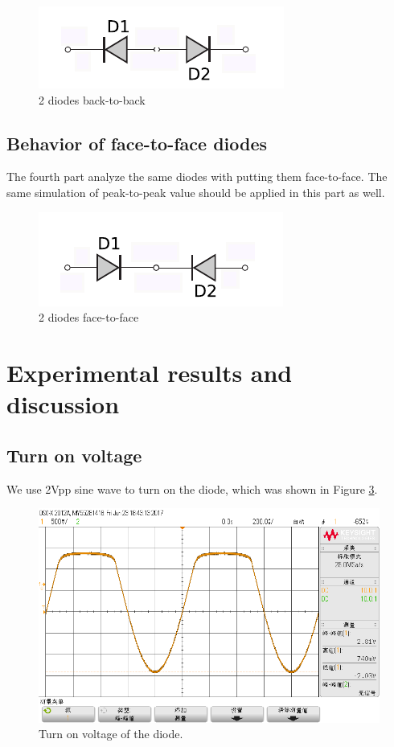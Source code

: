 \documentclass{article}
\begin{document}
\begin{figure}[htbp]
	\centering
	\includegraphics[width=0.5\linewidth]{imgs/intro-3.png}
	\caption{2 diodes back-to-back}
	\label{fig-intro-3}
\end{figure}

\subsection{Behavior of face-to-face diodes}
The fourth part analyze the same diodes with putting them face-to-face. The same simulation of peak-to-peak value should be applied in this part as well.

\begin{figure}[htbp]
	\centering
	\includegraphics[width=0.5\linewidth]{imgs/intro-4.png}
	\caption{2 diodes face-to-face}
	\label{fig-intro-4}
\end{figure}

\newpage
\section{Experimental results and discussion}

\subsection{Turn on voltage}

We use 2Vpp sine wave to turn on the diode, which was shown in Figure \ref{fig-1}.

\begin{figure}[htbp]
	\centering
	\includegraphics[width=0.7\linewidth]{imgs/scope_30.png}
	\caption{Turn on voltage of the diode.}
	\label{fig-1}
\end{figure}
\end{document}
